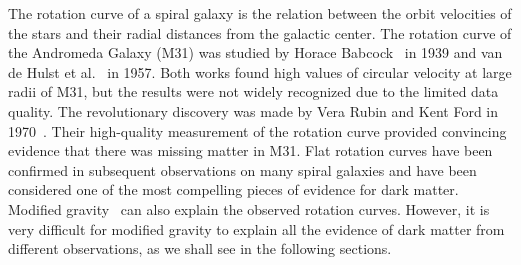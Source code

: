 \documentclass[doublespace,nopageskip]{VTthesis}
\begin{document}


The rotation curve of a spiral galaxy is the relation between the orbit velocities of the stars and their radial distances from the galactic center. The rotation curve of the Andromeda Galaxy (M31) was studied by Horace Babcock~\cite{1939LicOB..19....1B} in 1939 and van de Hulst et al.~\cite{1957BAN....14....1V} in 1957. Both works found high values of circular velocity at large radii of M31, but the results were not widely recognized due to the limited data quality. The revolutionary discovery was made by Vera Rubin and Kent Ford in 1970~\cite{1970ApJ...159..379R}. Their high-quality measurement of the rotation curve provided convincing evidence that there was missing matter in M31. Flat rotation curves have been confirmed in subsequent observations on many spiral galaxies and have been considered one of the most compelling pieces of evidence for dark matter. {{Modified gravity~\cite{1983ApJ...270..365M} can also explain the observed rotation curves. However, it is very difficult for modified gravity to explain all the evidence of dark matter from different observations, as we shall see in the following sections.}}
\end{document}
